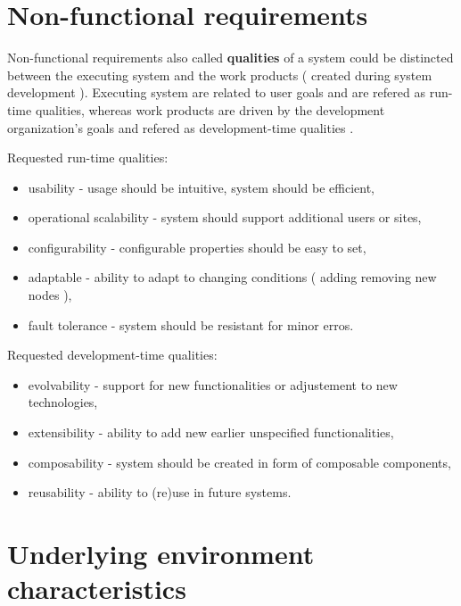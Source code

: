 \documentclass[11pt]{book}
\begin{document}
    \section{Non-functional requirements}
		\label{sec:req:nonfunc}

	
		Non-functional requirements also called \textbf{qualities} of a system could be distincted between 
		the executing system and the work products ( created during system development ). Executing system are related
		to user goals and are refered as run-time qualities, whereas work products are driven by the development organization’s
		goals and refered as development-time qualities \cite{nonfunctional}. 

                \medskip
		
		Requested run-time qualities:
		\begin{itemize}
			\item{usability - usage should be intuitive, system should be efficient,}
			\item{operational scalability - system should support additional users or sites, }
			\item{configurability - configurable properties should be easy to set,}
			\item{adaptable - ability to adapt to changing conditions ( adding removing new nodes ),}
			\item{fault tolerance - system should be resistant for minor erros.}
		\end{itemize}
		
		\medskip
		
		Requested development-time qualities:
		\begin{itemize}
			\item{evolvability - support for new functionalities or adjustement to new technologies,}
			\item{extensibility - ability to add new earlier unspecified functionalities, }
			\item{composability - system should be created in form of composable components, }
			\item{reusability - ability to (re)use in future systems.}
		\end{itemize}
		

    \section{Underlying environment characteristics}
	
\end{document}
